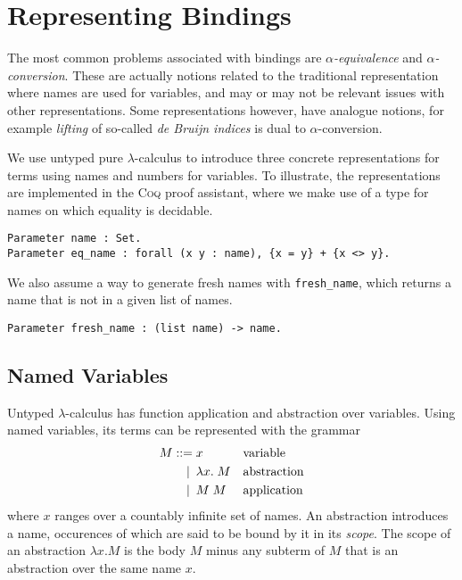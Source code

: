 \documentclass[a4paper,11pt]{article}
\newcommand{\name}[1]{\textsc{#1}\xspace}
\def\Coq{\name{Coq}}
\begin{document}
\section{Representing Bindings}\label{sec:representing}

The most common problems associated with bindings are {\em $\alpha$-equivalence}
and {\em $\alpha$-conversion}.
These are actually notions related to the traditional representation where
names are used for variables, and may or may not be relevant issues with
other representations.
Some representations however, have analogue notions, for example {\em lifting}
of so-called {\em de Bruijn indices} is dual to $\alpha$-conversion.

We use untyped pure $\lambda$-calculus \cite{Barendregt-84} to introduce
three concrete representations for terms using names and numbers for
variables. To illustrate, the representations are implemented in the
\Coq proof assistant, where we make use of a type for names on which
equality is decidable.
\begin{lstlisting}
Parameter name : Set.
Parameter eq_name : forall (x y : name), {x = y} + {x <> y}.
\end{lstlisting}
We also assume a way to generate fresh names with \lstinline{fresh_name},
which returns a name that is not in a given list of names.
\begin{lstlisting}
Parameter fresh_name : (list name) -> name.
\end{lstlisting}


\subsection{Named Variables}

Untyped $\lambda$-calculus has function application and abstraction over
variables. Using named variables, its terms can be represented with the
grammar
\begin{align*}
  M ::=             &\; x
  && \text{variable} \\
  \llap{\textbar\:} &\; \lambda x. \; M
  && \text{abstraction} \\
  \llap{\textbar\:} &\; M \; M
  && \text{application}
\end{align*}
where $x$ ranges over a countably infinite set of names.
An abstraction introduces a name, occurences of which are said to be
bound by it in its {\em scope}. The scope of an abstraction $\lambda
x.M$ is the body $M$ minus any subterm of $M$ that is an abstraction
over the same name $x$.
\end{document}
